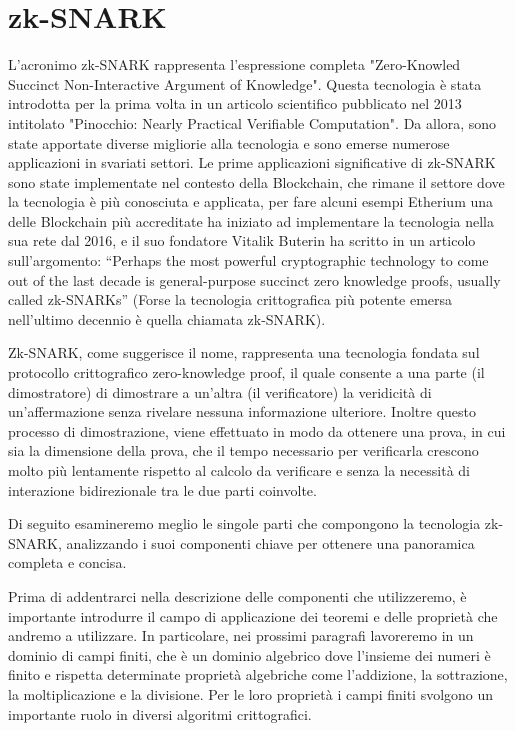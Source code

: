 \section{zk-SNARK}

L'acronimo zk-SNARK rappresenta l'espressione completa "Zero-Knowled Succinct Non-Interactive Argument of Knowledge".
Questa tecnologia è stata introdotta per la prima volta in un articolo scientifico pubblicato nel 2013 intitolato
"Pinocchio: Nearly Practical Verifiable Computation". Da allora, sono state apportate diverse migliorie alla tecnologia
e sono emerse numerose applicazioni in svariati settori. Le prime applicazioni significative di zk-SNARK sono state
implementate nel contesto della Blockchain, che rimane il settore dove la tecnologia è più conosciuta e applicata, per
fare alcuni esempi Etherium una delle Blockchain più accreditate  ha iniziato ad implementare la tecnologia nella sua
rete dal 2016, e il suo fondatore Vitalik Buterin ha scritto in un articolo sull’argomento: “Perhaps the most powerful
cryptographic technology to come out of the last decade is general-purpose succinct zero knowledge proofs, usually
called zk-SNARKs” (Forse la tecnologia crittografica più potente emersa nell'ultimo decennio è quella chiamata
zk-SNARK).

Zk-SNARK, come suggerisce il nome, rappresenta una tecnologia fondata sul protocollo crittografico zero-knowledge proof,
il quale consente a una parte (il dimostratore) di dimostrare a un'altra (il verificatore) la veridicità di
un'affermazione senza rivelare nessuna informazione ulteriore. Inoltre questo processo di dimostrazione, viene
effettuato in modo da ottenere una prova, in cui sia la dimensione della prova, che il tempo necessario per verificarla
crescono molto più lentamente rispetto al calcolo da verificare e senza la necessità di interazione bidirezionale tra le
due parti coinvolte.

Di seguito esamineremo meglio le singole parti che compongono la tecnologia zk-SNARK, analizzando i suoi componenti
chiave per ottenere una panoramica completa e concisa.

Prima di addentrarci nella descrizione delle componenti che utilizzeremo, è importante introdurre il campo di
applicazione dei teoremi e delle proprietà che andremo a utilizzare. In particolare, nei prossimi paragrafi lavoreremo
in un dominio di campi finiti, che è un dominio algebrico dove l'insieme dei numeri è finito e rispetta determinate
proprietà algebriche come l'addizione, la sottrazione, la moltiplicazione e la divisione. Per le loro proprietà i campi
finiti svolgono un importante ruolo in diversi algoritmi crittografici.

